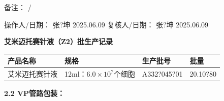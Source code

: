 \documentclass[UTF8,10pt,a4paper,fontset=fandol]{ctexart}
\newcommand{\fieldvalue}[1]{#1}
\newcommand{\handwritten}[1]{#1}
\begin{document}
备注：%
\fieldvalue{\handwritten{/}}

\noindent
操作人/日期：%
\fieldvalue{\handwritten{张?坤}}\quad
\fieldvalue{\handwritten{2025.06.09}}
\hfill
复核人/日期：%
\fieldvalue{\handwritten{张?坤}}\quad
\fieldvalue{\handwritten{2025.06.09}}

\newpage

\begin{center}
\textbf{艾米迈托赛针液（Z2）批生产记录}
\end{center}

\begin{tabularx}{\textwidth}{|>{\centering\arraybackslash}X|>{\centering\arraybackslash}X|>{\centering\arraybackslash}X|>{\centering\arraybackslash}X|}
\hline
产品名称 & 规格 & 生产批号 & 批量 \\
\hline
艾米迈托赛针液 & 12ml：$6.0\times10^{7}$个细胞 &
\fieldvalue{\handwritten{A332?045?01}} &
\fieldvalue{\handwritten{20.10?80}} \\
\hline
\end{tabularx}

\medskip

\textbf{2.2 VP管路包装：}
\end{document}
